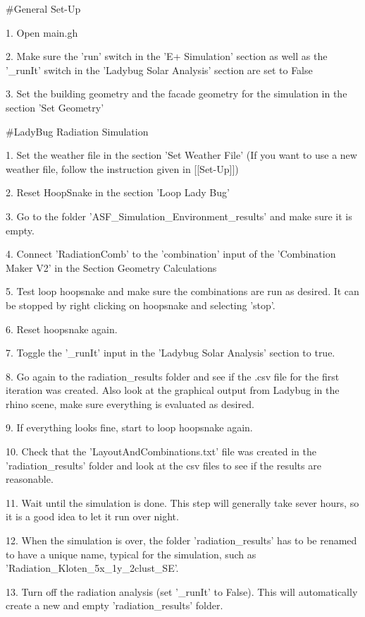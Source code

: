 {	#General Set-Up

	1. Open main.gh

	2. Make sure the 'run' switch in the 'E+ Simulation' section as well as the '_runIt' switch in the 'Ladybug Solar Analysis' section are set to False 

	3. Set the building geometry and the facade geometry for the simulation in the section 'Set Geometry'

	#LadyBug Radiation Simulation

	1. Set the weather file in the section 'Set Weather File' (If you want to use a new weather file, follow the instruction given in [[Set-Up]])

	2. Reset HoopSnake in the section 'Loop Lady Bug'

	3. Go to the folder 'ASF_Simulation\Simulation_Environment\data\grasshopper\LadyBug\radiation_results' and make sure it is empty. 

	4. Connect 'RadiationComb' to the 'combination' input of the 'Combination Maker V2' in the Section Geometry Calculations

	5. Test loop hoopsnake and make sure the combinations are run as desired. It can be stopped by right clicking on hoopsnake and selecting 'stop'. 

	6. Reset hoopsnake again. 

	7. Toggle the '_runIt' input in the 'Ladybug Solar Analysis' section to true. 

	8. Go again to the radiation_results folder and see if the .csv file for the first iteration was created. Also look at the graphical output from Ladybug in the rhino scene, make sure everything is evaluated as desired. 

	9. If everything looks fine, start to loop hoopsnake again. 

	10. Check that the 'LayoutAndCombinations.txt' file was created in the 'radiation_results' folder and look at the csv files to see if the results are reasonable. 

	11. Wait until the simulation is done. This step will generally take sever hours, so it is a good idea to let it run over night. 

	12. When the simulation is over, the folder 'radiation_results' has to be renamed to have a unique name, typical for the simulation, such as 'Radiation_Kloten_5x_1y_2clust_SE'. 

	13. Turn off the radiation analysis (set '_runIt' to False). This will automatically create a new and empty 'radiation_results' folder.  

}
